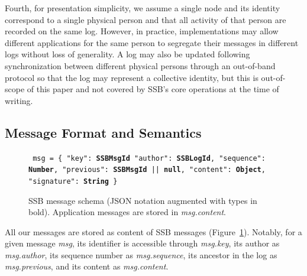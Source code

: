 \documentclass[sigplan,screen,10pt]{acmart}
\begin{document}
Fourth, for presentation simplicity, we assume a single node and its identity correspond to a single physical person and that all activity of that person are recorded on the same log. However, in practice, implementations may allow different applications for the same person to segregate their messages in different logs without loss of generality. A log may also be updated following synchronization between different physical persons through an out-of-band protocol so that the log may represent a collective identity,  but this is out-of-scope of this paper and not covered by SSB's core operations at the time of writing.

\subsection{Message Format and Semantics}

\begin{figure}[t]
\flushleft
\texttt{ msg = \{ 
     "key": \textbf{SSBMsgId}
     "author": \textbf{SSBLogId}, 
     "sequence": \textbf{Number}, 
     "previous": \textbf{SSBMsgId} || \textbf{null},  
     "content": \textbf{Object},
     "signature": \textbf{String}
\} 
     }
\caption[]{SSB message schema (JSON notation augmented with types in bold). Application messages are stored in \textit{msg.content}.\footnotemark }
\label{fig:ssb-message-schema}
\end{figure}


All our messages are stored as content of SSB messages (Figure~\ref{fig:ssb-message-schema}). Notably, for a given message \textit{msg}, its identifier is accessible through \textit{msg.key}, its author as \textit{msg.author}, its sequence number as \textit{msg.sequence}, its ancestor in the log as \textit{msg.previous}, and its content as \textit{msg.content}.
\end{document}
